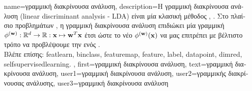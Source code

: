 {name={\foreignlanguage{greek}{γραμμική διακρίνουσα ανάλυση}}, 
	description={\foreignlanguage{greek}{Η γραμμική διακρίνουσα ανάλυση} 
		(linear discriminant analysis - LDA) \foreignlanguage{greek}{είναι μία κλασική μέθοδος}  
		\cite{BishopBook}, \cite{Fisher1936Taxonomic}. 
		\foreignlanguage{greek}{Στο πλαίσιο προβλημάτων} , \foreignlanguage{greek}{η γραμμική διακρίνουσα ανάλυση 
		επιδιώκει μία γραμμική}  $\phi^{({\bf w})}: \mathbb{R}^{d} 
		\rightarrow \mathbb{R}: {\bf x} \mapsto {\bf w}^{T} {\bf x}$ \foreignlanguage{greek}{έτσι ώστε το νέο}
		 $\phi^{({\bf w})}({\bf x})$ \foreignlanguage{greek}{να μας επιτρέπει με βέλτιστο τρόπο να 
		προβλέψουμε την}  \foreignlanguage{greek}{ενός} . 
		\\
		\foreignlanguage{greek}{Βλέπε επίσης:} \gls{featlearn}, \gls{binclass}, \gls{featuremap}, \gls{feature}, \gls{label}, \gls{datapoint}, 
		\gls{dimred}, \gls{selfsupervisedlearning}. }, 
 	first={\foreignlanguage{greek}{γραμμική διακρίνουσα ανάλυση}},
 	text={\foreignlanguage{greek}{γραμμική διακρίνουσα ανάλυση}},
	user1={\foreignlanguage{greek}{γραμμική διακρίνουσα ανάλυση}}, %
	user2={\foreignlanguage{greek}{γραμμικής διακρίνουσας ανάλυσης}}, %
	user3={\foreignlanguage{greek}{γραμμική διακρίνουσα ανάλυση}} %
}

